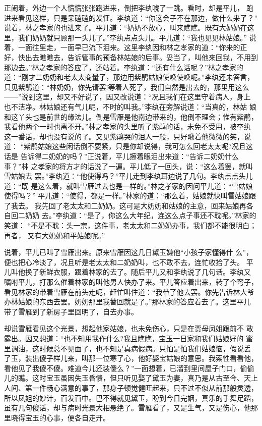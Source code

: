正闹着，外边一个人慌慌张张跑进来，倒把李纨唬了一跳。看时，却是平儿，
跑进来看见这样，只是呆磕磕的发怔。李纨道：“你这会子不在那边，做什么来了？”
说着，林之孝家的也进来了。平儿道：“奶奶不放心，叫来瞧瞧。既有大奶奶在这
里，我们奶奶就只顾那一头儿了。”李纨点点头儿。平儿道：“我也见见林姑娘。”
说着，一面往里走，一面早已流下泪来。这里李纨因和林之孝家的道：“你来的正
好，快出去瞧瞧去，告诉管事的预备林姑娘的后事。妥当了，叫他来回我，不用到
那边去。”林之孝家的答应了，还站着。李纨道：“还有什么话呢？”林之孝家的
道：“刚才二奶奶和老太太商量了，那边用紫鹃姑娘使唤使唤呢。”李纨还未答言，
只见紫鹃道：“林奶奶，你先请罢!等着人死了，我们自然是出去的，那里用这么
——”说到这里，却又不好说了，因又改说道：“况且我们在这里守着病人，身上
也不洁净。林姑娘还有气儿呢，不时的叫我。”李纨在旁解说道：“当真的，林姑
娘和这丫头也是前世的缘法儿。倒是雪雁是他南边带来的，他倒不理会；惟有紫鹃，
我看他两个一时也离不开。”林之孝家的头里听了紫鹃的话，未免不受用，被李纨
这一番话，却也没有说的了。又见紫鹃哭的泪人一般，只好瞅着他微微的笑，说道：
“紫鹃姑娘这些闲话倒不要紧，只是你却说得，我可怎么回老太太呢?况且这话是
告诉得二奶奶的吗？”正说着，平儿擦着眼泪出来道：“告诉二奶奶什么事？”林
之孝家的将方才的话说了一遍。平儿低了一回头，说：“这么着罢，就叫雪姑娘去
罢。”李纨道：“他使得吗？”平儿走到李纨耳边说了几句。李纨点点头儿道：“既
是这么着，就叫雪雁过去也是一样的。”林之孝家的因问平儿道：“雪姑娘使得吗？”
平儿道：“使得，都是一样。”林家的道：“那么着，姑娘就快叫雪姑娘跟了我去。
我先回了老太太和二奶奶。这可是大奶奶和姑娘的主意，回来姑娘再各自回二奶奶
去。”李纨道：“是了，你这么大年纪，连这么点子事还不耽呢。”林家的笑道：
“不是不耽：头一宗，这件事，老太太和二奶奶办事，我们都不能很明白；再者，
又有大奶奶和平姑娘呢。”

说着，平儿已叫了雪雁出来。原来雪雁因这几日黛玉嫌他“小孩子家懂得什
么”，便也把心冷淡了，况且听是老太太和二奶奶叫，也不敢不去，连忙收拾了头。
平儿叫他换了新鲜衣服，跟着林家的去了。随后平儿又和李纨说了几句话。李纨又
嘱咐平儿，打那么催着林家的叫他男人快办了来。平儿答应着出来，转了个弯子，
看见林家的带着雪雁在前头走呢，赶忙叫住道：“我带了他去罢。你先告诉林大爷
办林姑娘的东西去罢。奶奶那里我替回就是了。”那林家的答应着去了。这里平儿
带了雪雁到了新房子里回明了，自去办事。

却说雪雁看见这个光景，想起他家姑娘，也未免伤心，只是在贾母凤姐跟前不
敢露出。因又想道：“也不知用我作什么?我且瞧瞧，宝玉一日家和我们姑娘好的
蜜里调油，这时候总不见面了，也不知是真病假病。只怕是怕我们姑娘恼，假说丢
了玉，装出傻子样儿来，叫那一位寒了心，他好娶宝姑娘的意思。我索性看看他，
看他见了我傻不傻。难道今儿还装傻么？”一面想着，已溜到里间屋子门口，偷偷
儿的瞧。这时宝玉虽因失玉昏愦，但只听见娶了黛玉为妻，真乃是从古至今、天上
人间、第一件畅心满意的事了，那身子顿觉健旺起来，只不过不似从前那般灵透，
所以凤姐的妙计，百发百中。巴不得就见黛玉，盼到今日完姻，真乐的手舞足蹈，
虽有几句傻话，却与病时光景大相悬绝了。雪雁看了，又是生气，又是伤心，他那
里晓得宝玉的心事，便各自走开。


